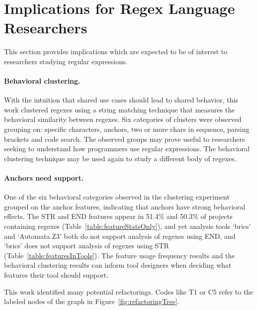\section{Implications for Regex Language Researchers}
This section provides implications which are expected to be of interest to researchers studying regular expressions.

\paragraph{Behavioral clustering.}  With the intuition that shared use cases should lead to shared behavior, this work clustered regexes using a string matching technique that measures the behavioral similarity between regexes.  Six categories of clusters were observed grouping on: specific characters, anchors, two or more chars in sequence, parsing brackets and code search.  The observed groups may prove useful to researchers seeking to understand how programmers use regular expressions.  The behavioral clustering technique may be used again to study a different body of regexes.

\paragraph{Anchors need support.}  One of the six behavioral categories observed in the clustering experiment grouped on the anchor features, indicating that anchors have strong behavioral effects.  The STR and END features appear in 51.4\% and 50.3\% of projects containing regexes (Table~\ref{table:featureStatsOnly}), and yet analysis tools `brics' and `Automata.Z3' both do not support analysis of regexes using END, and `brics' does not support analysis of regexes using STR (Table~\ref{table:featuresInTools}).  The feature usage frequency results and the behavioral clustering results can inform tool designers when deciding what features their tool should support.

This work identified many potential refactorings.  Codes like T1 or C5 refer to the labeled nodes of the graph in Figure~\ref{fig:refactoringTree}.

